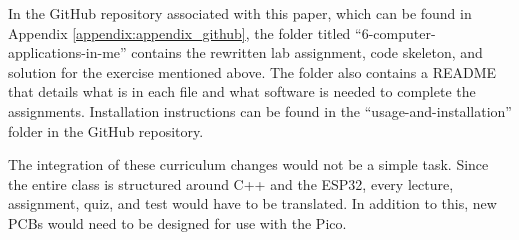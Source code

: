 In the GitHub repository associated with this paper, which can be found in Appendix
\ref{appendix:appendix_github}, the folder titled ``6-computer-applications-in-me'' 
contains the rewritten lab assignment, code skeleton, and solution for the exercise
mentioned above. The folder also contains a README that details what is in each file
and what software is needed to complete the assignments. Installation instructions can
be found in the ``usage-and-installation'' folder in the GitHub repository.

The integration of these curriculum changes would not be a simple task. Since the 
entire class is structured around C++ and the ESP32, every lecture, assignment, quiz,
and test would have to be translated. In addition to this, new PCBs would need to be 
designed for use with the Pico. 
